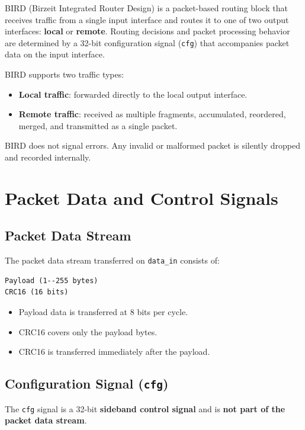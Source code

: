 \documentclass[11pt,a4paper]{article}
\begin{document}
BIRD (Birzeit Integrated Router Design) is a packet-based routing block that receives traffic from a single input interface and routes it to one of two output interfaces: \textbf{local} or \textbf{remote}. Routing decisions and packet processing behavior are determined by a 32-bit configuration signal (\texttt{cfg}) that accompanies packet data on the input interface.

BIRD supports two traffic types:
\begin{itemize}
  \item \textbf{Local traffic}: forwarded directly to the local output interface.
  \item \textbf{Remote traffic}: received as multiple fragments, accumulated, reordered, merged, and transmitted as a single packet.
\end{itemize}

BIRD does not signal errors. Any invalid or malformed packet is silently dropped and recorded internally.

\section{Packet Data and Control Signals}

\subsection{Packet Data Stream}

The packet data stream transferred on \texttt{data\_in} consists of:
\begin{verbatim}
Payload (1--255 bytes)
CRC16 (16 bits)
\end{verbatim}

\begin{itemize}
  \item Payload data is transferred at 8 bits per cycle.
  \item CRC16 covers only the payload bytes.
  \item CRC16 is transferred immediately after the payload.
\end{itemize}

\subsection{Configuration Signal (\texttt{cfg})}

The \texttt{cfg} signal is a 32-bit \textbf{sideband control signal} and is \textbf{not part of the packet data stream}.
\end{document}
